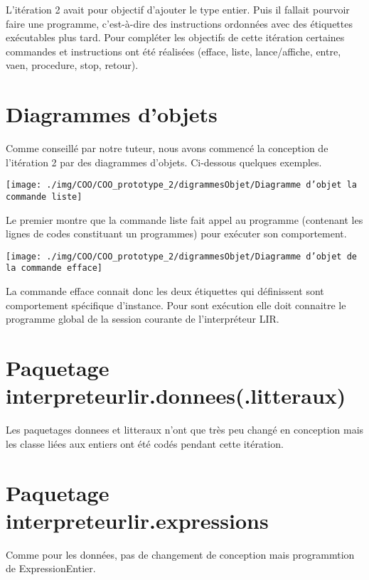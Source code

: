 \par L'itération 2 avait pour objectif d'ajouter le type entier. Puis il fallait pourvoir faire une programme, c'est-à-dire des instructions ordonnées avec des étiquettes exécutables plus tard. Pour compléter les objectifs de cette itération certaines commandes et instructions ont été réalisées (efface, liste, lance/affiche, entre, vaen, procedure, stop, retour).

\section{Diagrammes d'objets}
Comme conseillé par notre tuteur, nous avons commencé la conception de l'itération 2 par des diagrammes d'objets. Ci-dessous quelques exemples.
\par
\texttt{[image: ./img/COO/COO\_prototype\_2/digrammesObjet/Diagramme d'objet la commande liste]}
\par Le premier montre que la commande liste fait appel au programme (contenant les lignes de codes constituant un programmes) pour exécuter son comportement.
\par
\texttt{[image: ./img/COO/COO\_prototype\_2/digrammesObjet/Diagramme d'objet de la commande efface]}
\par La commande efface connait donc les deux étiquettes qui définissent sont comportement spécifique d'instance. Pour sont exécution elle doit connaitre le programme global de la session courante de l'interpréteur LIR.

\section{Paquetage interpreteurlir.donnees(.litteraux)}
\par Les paquetages donnees et litteraux n'ont que très peu changé en conception mais les classe liées aux entiers ont été codés pendant cette itération.

\section{Paquetage interpreteurlir.expressions}
\par Comme pour les données, pas de changement de conception mais programmtion de ExpressionEntier.

